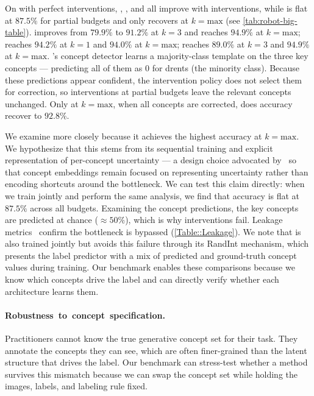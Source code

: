 \documentclass[11pt]{article}
\begin{document}
On  with perfect interventions, \CBM{}, \CEM{}, and \ProbCBM{} all improve with interventions, while \ECBM{} is flat at $87.5\%$ for partial budgets and only recovers at $k{=}\text{max}$ (see \cref{tab:robot-big-table}). \CBM{} improves from $79.9\%$ to $91.2\%$ at $k{=}3$ and reaches $94.9\%$ at $k{=}\text{max}$; \CEM{} reaches $94.2\%$ at $k{=}1$ and $94.0\%$ at $k{=}\text{max}$; \ProbCBM{} reaches $89.0\%$ at $k{=}3$ and $94.9\%$ at $k{=}\text{max}$. \ECBM{}'s concept detector learns a majority-class template on the three key concepts --- predicting all of them as $0$ for drents (the minority class). Because these predictions appear confident, the intervention policy does not select them for correction, so interventions at partial budgets leave the relevant concepts unchanged. Only at $k{=}\text{max}$, when all concepts are corrected, does accuracy recover to $92.8\%$.

We examine \ProbCBM{} more closely because it achieves the highest accuracy at $k{=}\text{max}$. We hypothesize that this stems from its sequential training and explicit representation of per-concept uncertainty --- a design choice advocated by~\citet{kim2023probabilistic} so that concept embeddings remain focused on representing uncertainty rather than encoding shortcuts around the bottleneck. We can test this claim directly: when we train \ProbCBM{} jointly and perform the same analysis, we find that accuracy is flat at $87.5\%$ across all budgets. Examining the concept predictions, the key concepts are predicted at chance (${\approx}50\%$), which is why interventions fail. Leakage metrics~\citep{parisini2025leakage} confirm the bottleneck is bypassed (\cref{Table::Leakage}). We note that \CEM{} is also trained jointly but avoids this failure through its RandInt mechanism, which presents the label predictor with a mix of predicted and ground-truth concept values during training. Our benchmark enables these comparisons because we know which concepts drive the label and can directly verify whether each architecture learns them.

\paragraph[Robustness to concept specification]{\mbox{Robustness to concept specification.}}
\label{Sec::ConceptSpecification}

Practitioners cannot know the true generative concept set for their task. They annotate the concepts they can see, which are often finer-grained than the latent structure that drives the label. Our benchmark can stress-test whether a method survives this mismatch because we can swap the concept set while holding the images, labels, and labeling rule fixed.
\end{document}

